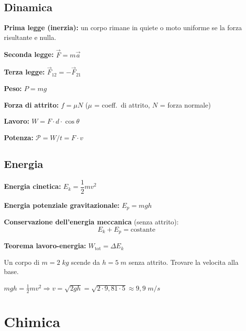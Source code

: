 \documentclass[12pt, a4paper, twoside, openright]{book}
\theoremstyle{definition}
\begin{document}
\section{Dinamica}

\begin{formulario}
\textbf{Prima legge (inerzia):} un corpo rimane in quiete o moto uniforme se la forza risultante e nulla.

\textbf{Seconda legge:} $\vec{F} = m\vec{a}$

\textbf{Terza legge:} $\vec{F}_{12} = -\vec{F}_{21}$

\textbf{Peso:} $P = mg$

\textbf{Forza di attrito:} $f = \mu N$ \quad ($\mu$ = coeff.\ di attrito, $N$ = forza normale)

\textbf{Lavoro:} $W = F \cdot d \cdot \cos\theta$ \quad [J = N$\cdot$m]

\textbf{Potenza:} $\mathcal{P} = W/t = F \cdot v$ \quad [W = J/s]
\end{formulario}

\section{Energia}

\begin{formulario}
\textbf{Energia cinetica:} $E_k = \dfrac{1}{2}mv^2$

\textbf{Energia potenziale gravitazionale:} $E_p = mgh$

\textbf{Conservazione dell'energia meccanica} (senza attrito):
\[
E_k + E_p = \text{costante}
\]

\textbf{Teorema lavoro-energia:} $W_\text{tot} = \Delta E_k$
\end{formulario}

\begin{esercizio}
Un corpo di $m = 2\;\si{kg}$ scende da $h = 5\;\si{m}$ senza attrito.
Trovare la velocita alla base.
\end{esercizio}
\begin{soluzione}
$mgh = \tfrac{1}{2}mv^2 \Rightarrow v = \sqrt{2gh} = \sqrt{2 \cdot 9{,}81 \cdot 5} \approx 9{,}9\;\si{m/s}$
\end{soluzione}

\chapter{Chimica}
\end{document}
